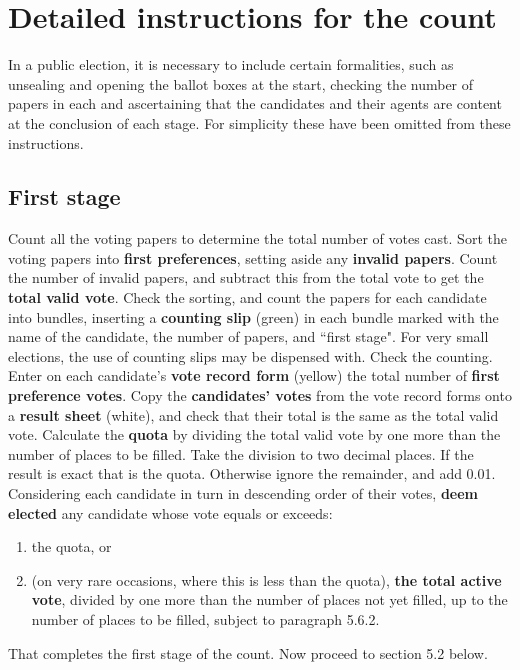 \section{Detailed instructions for the count}

In a public election, it is necessary to include certain formalities, such as unsealing and opening the ballot boxes at the start, checking the number of papers in each and ascertaining that the candidates and their agents are content at the conclusion of each stage. For simplicity these have been omitted from these instructions.

\subsection{First stage}
\appnpara Count all the voting papers to determine the total number of votes cast.
\appnpara Sort the voting papers into \textbf{first preferences}, setting aside any \textbf{invalid papers}. Count the number of invalid papers, and subtract this from the total vote to get the \textbf{total valid vote}.
\appnpara Check the sorting, and count the papers for each candidate into bundles, inserting a \textbf{counting slip }(green) in each bundle marked with the name of the candidate, the number of papers, and ``first stage". For very small elections, the use of counting slips may be dispensed with.
\appnpara Check the counting. Enter on each candidate’s \textbf{vote record form} (yellow) the total number of\textbf{ first preference votes}.
\appnpara Copy the \textbf{candidates' votes} from the vote record forms onto a\textbf{ result sheet} (white), and check that their total is the same as the total valid vote.
\appnpara Calculate the \textbf{quota} by dividing the total valid vote by one more than the number of places to be filled. Take the division to two decimal places. If the result is exact that is the quota. Otherwise ignore the remainder, and add 0.01.
\appnpara Considering each candidate in turn in descending order of their votes,\textbf{ deem elected} any candidate whose vote equals or exceeds:

\begin{enumerate}
    \item the quota, or
    \item (on very rare occasions, where this is less than the quota), \textbf{the total active vote}, divided by one more than the number of places not yet filled, up to the number of places to be filled, subject to paragraph 5.6.2.
\end{enumerate}
\appnpara That completes the first stage of the count. Now proceed to section 5.2 below.

